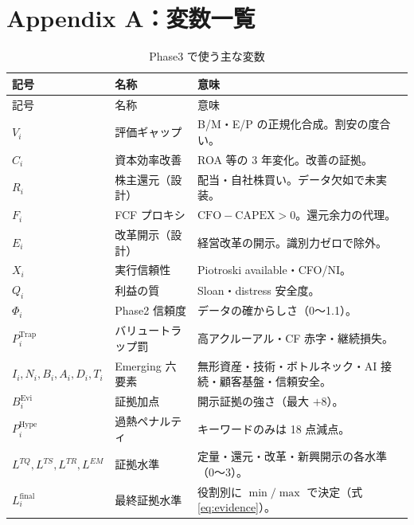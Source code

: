 \documentclass[a4paper,10pt]{article}
\newcommand{\metric}[1]{\mathrm{#1}}
\begin{document}
\section{Appendix A：変数一覧}
\begin{longtable}{p{28mm}p{42mm}p{74mm}}
\caption{Phase3 で使う主な変数}\\
\toprule
記号 & 名称 & 意味 \\
\midrule
\endfirsthead
\toprule
記号 & 名称 & 意味 \\
\midrule
\endhead
$V_i$ & 評価ギャップ & B/M・E/P の正規化合成。割安の度合い。 \\
$C_i$ & 資本効率改善 & ROA 等の 3 年変化。改善の証拠。 \\
$R_i$ & 株主還元（設計） & 配当・自社株買い。データ欠如で未実装。 \\
$F_i$ & FCF プロキシ & $\metric{CFO}-\metric{CAPEX}>0$。還元余力の代理。 \\
$E_i$ & 改革開示（設計） & 経営改革の開示。識別力ゼロで除外。 \\
$X_i$ & 実行信頼性 & Piotroski available・CFO/NI。 \\
$Q_i$ & 利益の質 & Sloan・distress 安全度。 \\
$\Phi_i$ & Phase2 信頼度 & データの確からしさ（0〜1.1）。 \\
$P^{\mathrm{Trap}}_i$ & バリュートラップ罰 & 高アクルーアル・CF 赤字・継続損失。 \\
$I_i,N_i,B_i,A_i,D_i,T_i$ & Emerging 六要素 & 無形資産・技術・ボトルネック・AI 接続・顧客基盤・信頼安全。 \\
$B^{\mathrm{Evi}}_i$ & 証拠加点 & 開示証拠の強さ（最大 $+8$）。 \\
$P^{\mathrm{Hype}}_i$ & 過熱ペナルティ & キーワードのみは 18 点減点。 \\
$L^{TQ},L^{TS},L^{TR},L^{EM}$ & 証拠水準 & 定量・還元・改革・新興開示の各水準（0〜3）。 \\
$L^{\mathrm{final}}_i$ & 最終証拠水準 & 役割別に $\min/\max$ で決定（式\eqref{eq:evidence}）。 \\
\bottomrule
\end{longtable}
\end{document}
